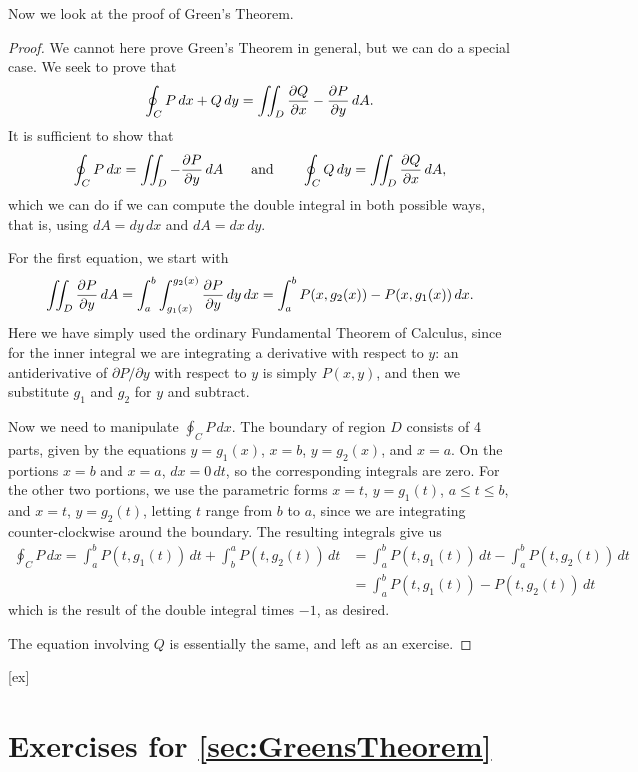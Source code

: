 Now we look at the proof of Green's Theorem.

\begin{proof}
We cannot here prove Green's Theorem in general, but we can do a
special case. We seek to prove that 
$$\oint_C P\,dx +Q\,dy = \iint_{D} {\partial Q\over\partial x}
-{\partial P\over\partial y} \,dA.$$
It is sufficient to show that
$$\oint_C P\,dx=\iint_{D}-{\partial P\over\partial y} \,dA\qquad\hbox{and}
\qquad\oint_C Q\,dy=\iint_{D} {\partial Q\over\partial x}\,dA,$$
which we can do if we can compute the double integral in both possible
ways, that is, using $dA=dy\,dx$ and $dA=dx\,dy$.

For the first equation, we start with
$$\iint_{D}{\partial P\over\partial y}\,dA=
\int_a^b\int_{g_1(x)}^{g_2(x)} {\partial P\over \partial y}\,dy\,dx=
\int_a^b P(x,g_2(x))-P(x,g_1(x))\,dx.$$
Here we have simply used the ordinary Fundamental Theorem of Calculus,
since for the inner integral we are integrating a derivative with
respect to $y$: an antiderivative of $\partial P/\partial y$ with
respect to $y$ is simply $P(x,y)$, and then we substitute $g_1$ and
$g_2$ for $y$ and subtract.

Now we need to manipulate $\oint_C P\,dx$. The boundary of region $D$
consists of 4 parts, given by the equations $y=g_1(x)$, $x=b$,
$y=g_2(x)$, and $x=a$. On the portions $x=b$ and $x=a$, $dx=0\,dt$, so
the corresponding integrals are zero. For the other two portions, we
use the parametric forms $x=t$, $y=g_1(t)$, $a\le t\le b$, and
$x=t$, $y=g_2(t)$, letting $t$ range from $b$ to $a$, since we are
integrating counter-clockwise around the boundary.
The resulting integrals give us
\begin{align*}
\oint_C P\,dx = \int_a^b P(t,g_1(t))\,dt+\int_b^a P(t,g_2(t))\,dt
&=\int_a^b P(t,g_1(t))\,dt-\int_a^b P(t,g_2(t))\,dt	\\
&=\int_a^b P(t,g_1(t))-P(t,g_2(t))\,dt
\end{align*}
which is the result of the double integral times $-1$, as desired.

The equation involving $Q$ is essentially the same, and left as an
exercise.
\end{proof}



[ex]
\section*{Exercises for \ref{sec:GreensTheorem}}

